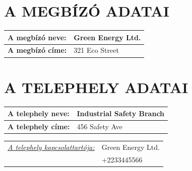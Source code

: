 \documentclass[a4paper,12pt]{article}
\renewcommand{\arraystretch}{0.5}
\begin{document}
	
	\section{A MEGBÍZÓ ADATAI}
		\begin{adjustwidth}{1cm}{0cm}
			
			\vspace{0.5em} %
			
			\noindent
			\renewcommand{\arraystretch}{1.4} %
			
			\begin{tabularx}{\textwidth}{ | p{4.5cm} | X | } %
				\hline
				\textbf{A megbízó neve:} & \textbf{Green Energy Ltd.} \\ \hline
				\textbf{A megbízó címe:} & 321 Eco Street \\ \hline
			\end{tabularx}
			
		\end{adjustwidth}
		
	\section{A TELEPHELY ADATAI}
		\begin{adjustwidth}{1cm}{0cm}
			\vspace{0.5em} %
			
			\noindent
			\renewcommand{\arraystretch}{1.4} %
			
			
			\begin{tabularx}{\textwidth}{ | p{4.5cm} | X | } %
				\hline
				\textbf{A telephely neve:} & \textbf{Industrial Safety Branch} \\ \hline
				\textbf{A telephely címe:} & 456 Safety Ave \\ \hline
			\end{tabularx}
			
			\vspace{0.5em} %
			
			\begin{tabular}{ p{5.5cm} p{8cm} } 
				\textit{\underline{A telephely kapcsolattartója:}} & Green Energy Ltd. \\  & +2233445566
			\end{tabular}
			
		\end{adjustwidth}
	
\end{document}

